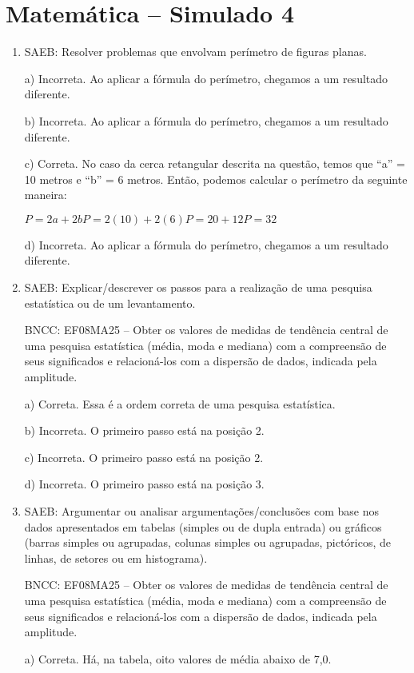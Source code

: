 \section*{Matemática – Simulado 4}

\begin{enumerate}
\item SAEB: Resolver problemas que envolvam perímetro de figuras planas.

a) Incorreta. Ao aplicar a fórmula do perímetro, chegamos a um
resultado diferente.

b) Incorreta. Ao aplicar a fórmula do perímetro, chegamos a um
resultado diferente.

c) Correta. No caso da cerca retangular descrita na questão, temos
que ``a'' = 10 metros e ``b'' = 6 metros. Então, podemos calcular o
perímetro da seguinte maneira:

$P = 2a + 2b P = 2(10) + 2(6) P = 20 + 12 P = 32$

d) Incorreta. Ao aplicar a fórmula do perímetro, chegamos a um
resultado diferente.

\item SAEB: Explicar/descrever os passos para a realização de uma pesquisa
estatística ou de um levantamento.

BNCC: EF08MA25 -- Obter os valores de medidas de tendência central de
uma pesquisa estatística (média, moda e mediana) com a compreensão de
seus significados e relacioná-los com a dispersão de dados, indicada
pela amplitude.

a) Correta. Essa é a ordem correta de uma pesquisa estatística.

b) Incorreta. O primeiro passo está na posição 2.

c) Incorreta. O primeiro passo está na posição 2.

d) Incorreta. O primeiro passo está na posição 3.

\item SAEB: Argumentar ou analisar argumentações/conclusões com base nos dados
apresentados em tabelas (simples ou de dupla entrada) ou gráficos
(barras simples ou agrupadas, colunas simples ou agrupadas, pictóricos,
de linhas, de setores ou em histograma).

BNCC: EF08MA25 -- Obter os valores de medidas de tendência central de
uma pesquisa estatística (média, moda e mediana) com a compreensão de
seus significados e relacioná-los com a dispersão de dados, indicada
pela amplitude.

a) Correta. Há, na tabela, oito valores de média abaixo de 7,0.


\end{enumerate}
